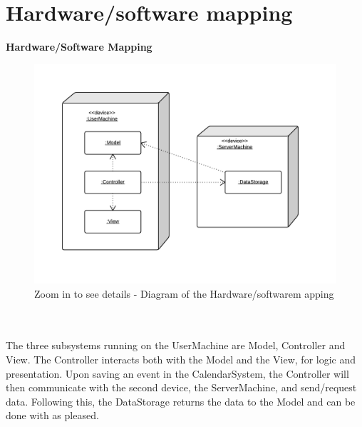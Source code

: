 \section{Hardware/software mapping}
\textbf{Hardware/Software Mapping}\\
\begin{figure}[h!]
	\centering
		\includegraphics[scale=0.4]{HardwareSoftwareMapping}
	\caption{Zoom in to see details - Diagram of the Hardware/softwarem apping}
  \label{fig:HardwareSoftwareMapping}
\end{figure}\\\\
The three subsystems running on the UserMachine are Model, Controller and View. The Controller interacts both with the Model and the View, for logic and presentation. Upon saving an event in the CalendarSystem, the Controller will then communicate with the second device, the ServerMachine, and send/request data. Following this, the DataStorage returns the data to the Model and can be done with as pleased.